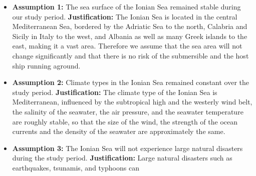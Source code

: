 \begin{itemize}
	\item \textbf{Assumption 1:} The sea surface of the Ionian Sea remained stable during our study period. \newline
	      \textbf{Justification:} The Ionian Sea is located in the central Mediterranean Sea, bordered by the Adriatic Sea to the north, Calabria and Sicily in Italy to the west, and Albania as well as many Greek islands to the east, making it a vast area. Therefore we assume that the sea area will not change significantly and that there is no risk of the submersible and the host ship running aground.


	\item \textbf{Assumption 2:} Climate types in the Ionian Sea remained constant over the study period.  \newline
	      \textbf{Justification:} The climate type of the Ionian Sea is Mediterranean, influenced by the subtropical high and the westerly wind belt, the salinity of the seawater, the air pressure, and the seawater temperature are roughly stable, so that the size of the wind, the strength of the ocean currents and the density of the seawater are approximately the same.


	\item \textbf{Assumption 3:} The Ionian Sea will not experience large natural disasters during the study period. \newline
	      \textbf{Justification:} Large natural disasters such as earthquakes, tsunamis, and typhoons can
\end{itemize}



